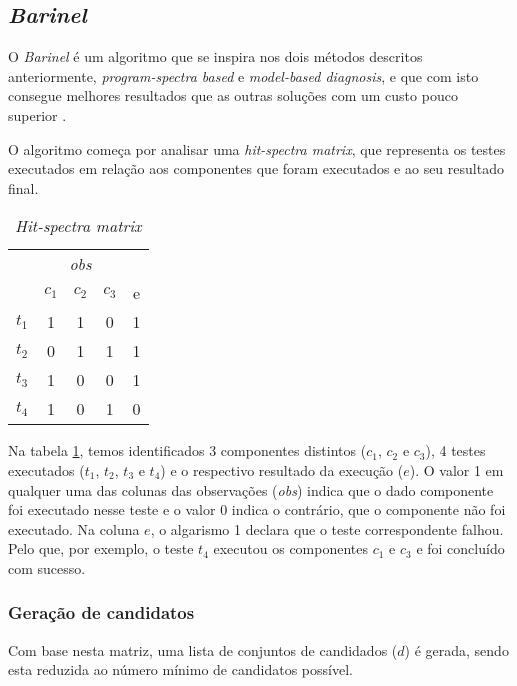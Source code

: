 \subsection{\emph{Barinel}}

O \emph{Barinel} é um algoritmo que se inspira nos dois métodos descritos anteriormente, \emph{program-spectra based} e \emph{model-based diagnosis}, e que com isto consegue melhores resultados que as outras soluções com um custo pouco superior \cite{Abreu2009}.

O algoritmo começa por analisar uma \emph{hit-spectra matrix}, que representa os testes executados em relação aos componentes que foram executados e ao seu resultado final.

\begin{table}[H]
	\centering
	\begin{tabular}{c|ccc|c} 
		& \multicolumn{3}{c|}{\textit{obs}} &  \\
		& $c_1$ & $c_2$ & $c_3$ & e \\ 
	 	\hline
		$t_1$ & 1 & 1 & 0 & 1 \\
		$t_2$ & 0 & 1 & 1 & 1 \\
		$t_3$ & 1 & 0 & 0 & 1 \\
		$t_4$ & 1 & 0 & 1 & 0 \\
	\end{tabular}
	\caption{\emph{Hit-spectra matrix}}
	\label{tab:hit-spectra}
\end{table}


Na tabela \ref{tab:hit-spectra}, temos identificados 3 componentes distintos ($c_1$, $c_2$ e $c_3$), 4 testes executados ($t_1$, $t_2$, $t_3$ e $t_4$) e o respectivo resultado da execução ($e$). O valor 1 em qualquer uma das colunas das observações (\emph{obs}) indica que o dado componente foi executado nesse teste e o valor 0 indica o contrário, que o componente não foi executado. Na coluna $e$, o algarismo 1 declara que o teste correspondente falhou. 
Pelo que, por exemplo, o teste $t_4$ executou os componentes $c_1$ e $c_3$ e foi concluído com sucesso.


% 
%

\subsubsection{Geração de candidatos} 

Com base nesta matriz, uma lista de conjuntos de candidados ($d$) é gerada, sendo esta reduzida ao número mínimo de candidatos possível. 

